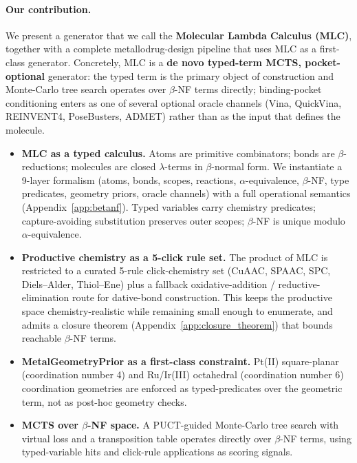 \paragraph{Our contribution.}
We present a generator that we call the \textbf{Molecular Lambda
Calculus (MLC)}, together with a complete metallodrug-design
pipeline that uses MLC as a first-class generator.
Concretely, MLC is a \textbf{de novo typed-term MCTS, pocket-optional}
generator: the typed term is the primary object of construction and
Monte-Carlo tree search operates over $\beta$-NF terms directly;
binding-pocket conditioning enters as one of several optional oracle
channels (Vina, QuickVina, REINVENT4, PoseBusters, ADMET) rather than
as the input that defines the molecule.
\begin{itemize}
  \item \textbf{MLC as a typed calculus.} Atoms are primitive
  combinators; bonds are $\beta$-reductions; molecules are closed
  $\lambda$-terms in $\beta$-normal form. We instantiate a 9-layer
  formalism (atoms, bonds, scopes, reactions, $\alpha$-equivalence,
  $\beta$-NF, type predicates, geometry priors, oracle channels) with
  a full operational semantics (Appendix~\ref{app:betanf}). Typed
  variables carry chemistry predicates; capture-avoiding substitution
  preserves outer scopes; $\beta$-NF is unique modulo
  $\alpha$-equivalence.
  \item \textbf{Productive chemistry as a 5-click rule set.}
  The product of MLC is restricted to a curated 5-rule click-chemistry
  set (CuAAC, SPAAC, SPC, Diels--Alder, Thiol--Ene) plus a
  fallback oxidative-addition / reductive-elimination route for
  dative-bond construction. This keeps the productive space
  chemistry-realistic while remaining small enough to enumerate,
  and admits a closure theorem (Appendix~\ref{app:closure_theorem})
  that bounds reachable $\beta$-NF terms.
  \item \textbf{MetalGeometryPrior as a first-class constraint.}
  Pt(II) square-planar (coordination number 4) and Ru/Ir(III)
  octahedral (coordination number 6) coordination geometries are
  enforced as typed-predicates over the geometric term, not as
  post-hoc geometry checks.
  \item \textbf{MCTS over $\beta$-NF space.} A PUCT-guided Monte-Carlo
  tree search with virtual loss and a transposition table operates
  directly over $\beta$-NF terms, using typed-variable hits and
  click-rule applications as scoring signals.
\end{itemize}

